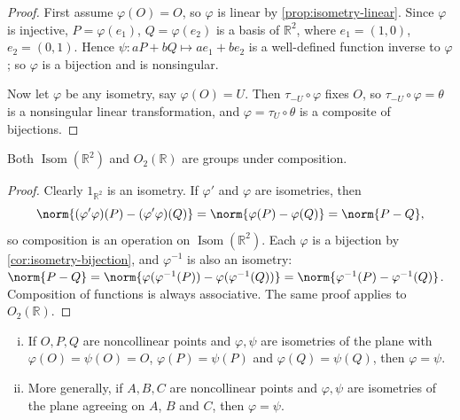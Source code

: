 \begin{proof}
	First assume \(\varphi(O) = O\), so \(\varphi\) is linear by
	\autoref{prop:isometry-linear}. Since \(\varphi\) is injective,
	\(P = \varphi(e_1)\), \(Q = \varphi(e_2)\) is a basis of \(\mathbb{R}^2\), where
	\(e_1 = (1,0)\), \(e_2 = (0,1)\). Hence
	\(\psi\colon aP + bQ \mapsto ae_1 + be_2\) is a well-defined function inverse to
	\(\varphi\); so \(\varphi\) is a bijection and is nonsingular.

	Now let \(\varphi\) be any isometry, say \(\varphi(O) = U\). Then
	\(\tau_{-U}\circ\varphi\) fixes \(O\), so \(\tau_{-U}\circ\varphi = \theta\) is a
	nonsingular linear transformation, and \(\varphi = \tau_U \circ \theta\) is a
	composite of bijections.
\end{proof}

\begin{proposition}\label{prop:isom-group}
	Both \(\operatorname{Isom}(\mathbb{R}^2)\) and \(O_2(\mathbb{R})\) are groups under
	composition.
\end{proposition}

\begin{proof}
	Clearly \(1_{\mathbb{R}^2}\) is an isometry. If \(\varphi'\) and \(\varphi\) are
	isometries, then
	\[
		\norm{(\varphi'\varphi)(P) - (\varphi'\varphi)(Q)}
		= \norm{\varphi(P) - \varphi(Q)}
		= \norm{P - Q},
	\]
	so composition is an operation on \(\operatorname{Isom}(\mathbb{R}^2)\). Each
	\(\varphi\) is a bijection by \autoref{cor:isometry-bijection}, and
	\(\varphi^{-1}\) is also an isometry:
	\(\norm{P-Q} = \norm{\varphi(\varphi^{-1}(P)) - \varphi(\varphi^{-1}(Q))} = \norm{\varphi^{-1}(P) - \varphi^{-1}(Q)}\).
	Composition of functions is always associative. The same proof applies to
	\(O_2(\mathbb{R})\).
\end{proof}

\begin{corollary}\label{cor:isometry-determined}
	\begin{enumerate}[(i)]
		\item If \(O, P, Q\) are noncollinear points and \(\varphi, \psi\) are isometries of
		      the plane with \(\varphi(O) = \psi(O) = O\), \(\varphi(P) = \psi(P)\) and
		      \(\varphi(Q) = \psi(Q)\), then \(\varphi = \psi\).
		\item More generally, if \(A, B, C\) are noncollinear points and \(\varphi, \psi\)
		      are isometries of the plane agreeing on \(A\), \(B\) and \(C\), then
		      \(\varphi = \psi\).
	\end{enumerate}
\end{corollary}


